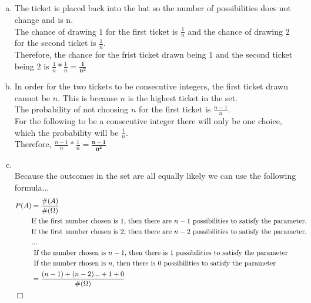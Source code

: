 \documentclass[10pt]{report}
\newenvironment{proof}{\par\noindent{\it Proof.}\hspace*{1em}}{$\Box$\bigskip}
\begin{document}
\subsection{}
 \begin{enumerate}[(a)]
 \item The ticket is placed back into the hat so the number of possibilities does not change and is n. \ \\ The chance of drawing $1 $ for the first ticket is $\frac{1}{n} $ and the chance of drawing $2 $ for the second ticket is $\frac{1}{n	} $. \ \\Therefore, the chance for the frist ticket drawn being $1 $ and the second ticket being $2 $ is $\frac{1}{n} * \frac{1}{n} = \mathbf{\frac{1}{n^2}} $
 \item In order for the two tickets to be consecutive integers, the first ticket drawn cannot be $n $. This is because $n $ is the highest ticket in the set. \ \\ The probability of not choosing $n $ for the first ticket is $\frac{n-1}{n} $. \ \\ For the following to be a consecutive integer there will only be one choice, which the probability will be $\frac{1}{n} $. \ \\ Therefore, $\frac{n-1}{n} * \frac{1}{n} = \mathbf{\frac{n-1}{n^2}} $
 \item 
 \begin{proof}\ \\
 Because the outcomes in the set are all equally likely we can use the following formula...
    \begin{align*}
    P(A) &= \frac{\#(A)}{\#(\Omega)} \\
    & \textnormal{If the first number chosen is } 1 \textnormal{, then there are }  n-1 \textnormal{ possibilities to satisfy the parameter. }\\ & \textnormal{If the first number chosen is } 2 \textnormal{, then there are }n-2 \textnormal{ possibilities to satisfy the parameter. } \\ & \textnormal{...} \\ & \textnormal{ If the number chosen is } n-1 \textnormal{, then there is } 1 \textnormal{ possibilities to satisfy the parameter} \\ & \textnormal{ If the number chosen is } n \textnormal{, then there is } 0 \textnormal{ possibilities to satisfy the parameter} \\
    &= \frac{(n-1) + (n-2) ... + 1 + 0}{\#(\Omega)} \\

\end{align*}
\end{proof}
\end{enumerate}
\end{document}
